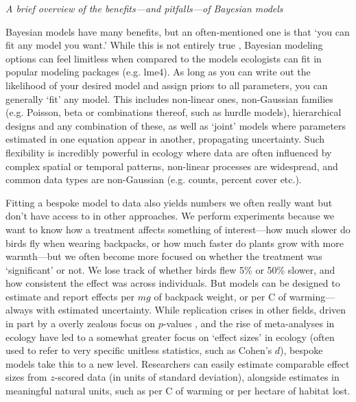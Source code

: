 \documentclass[11pt]{article}
\begin{document}
{\emph{A brief overview of the benefits---and pitfalls---of Bayesian models} 

Bayesian models have many benefits, but an often-mentioned one is that `you can fit any model you want.' While this is not entirely true \citep{BDA,reid2019}, Bayesian modeling options can feel limitless when compared to the models ecologists can fit in popular modeling packages (e.g. \textsf{lme4}). As long as you can write out the likelihood of your desired model \citep[and sometimes even if you can't;][]{Sunnaaker2013} and assign priors to all parameters, you can generally `fit' any model. This includes non-linear ones, non-Gaussian families (e.g. Poisson, beta or combinations thereof, such as hurdle models), hierarchical designs and any combination of these, as well as `joint' models where parameters estimated in one equation appear in another, propagating uncertainty. Such flexibility is incredibly powerful in ecology where data are often influenced by complex spatial or temporal patterns, non-linear processes are widespread, and common data types are non-Gaussian (e.g. counts, percent cover etc.). 

Fitting a bespoke model to data also yields numbers we often really want but don't have access to in other approaches. We perform experiments because we want to know how a treatment affects something of interest---how much slower do birds fly when wearing backpacks, or how much faster do plants grow with more warmth---but we often become more focused on whether the treatment was `significant' or not. We lose track of whether birds flew 5\% or 50\% slower, and how consistent the effect was across individuals. But models can be designed to estimate and report effects per $mg$ of backpack weight, or per \degree C of warming---always with estimated uncertainty. While replication crises in other fields, driven in part by a overly zealous focus on $p$-values \citep{halsey2015,loken2017}, and the rise of meta-analyses in ecology \citep{Hampton2013} have led to a somewhat greater focus on `effect sizes' in ecology (often used to refer to very specific unitless statistics, such as Cohen's $d$), bespoke models take this to a new level. Researchers can easily estimate comparable effect sizes from $z$-scored data (in units of standard deviation), alongside estimates in meaningful natural units, such as per \degree C of warming or per hectare of habitat lost.

}
\end{document}
